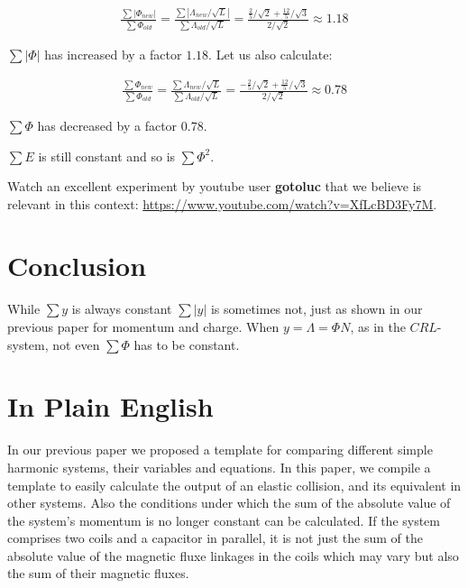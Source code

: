 \documentclass[]{elementary-physics}
\begin{document}
\begin{subequations}
\begin{align}
\frac{\sum |\Phi_{new}|}{\sum \Phi_{old}} = \frac{\sum |\Lambda_{new} / \sqrt{L}|}{\sum \Lambda_{old} / \sqrt{L}} = \frac{\frac{2}{5}/\sqrt{2}+\frac{12}{5}/\sqrt{3}}{2/\sqrt{2}}\approx 1.18
\end{align}
\end{subequations}

$\sum |\Phi|$ has increased by a factor $1.18$.
Let us also calculate:

\begin{subequations}
\begin{align}
\frac{\sum \Phi_{new}}{\sum \Phi_{old}} = \frac{\sum \Lambda_{new} / \sqrt{L}}{\sum \Lambda_{old} / \sqrt{L}} = \frac{-\frac{2}{5}/\sqrt{2}+\frac{12}{5}/\sqrt{3}}{2/\sqrt{2}}\approx 0.78
\end{align}
\end{subequations}

$\sum \Phi$ has decreased by a factor $0.78$.

$\sum E$ is still constant and so is $\sum {\Phi}^2$.

Watch an excellent experiment by youtube user \textbf{gotoluc} that we believe is relevant in this context: \url{https://www.youtube.com/watch?v=XfLcBD3Fy7M}.

\section{Conclusion}

While $\sum y$ is always constant $\sum |y|$ is sometimes not, just as shown in our previous paper\cite{ef2ch} for momentum and charge.
When $y = \Lambda = \Phi N$, as in the $CRL$-system, not even $\sum \Phi$ has to be constant.

\appendix

\section{In Plain English}

In our previous paper\cite{ef2ch} we proposed a template for comparing different simple harmonic systems, their variables and equations.
In this paper, we compile a template to easily calculate the output of an elastic collision, and its equivalent in other systems.
Also the conditions under which the sum of the absolute value of the system's momentum is no longer constant can be calculated.
If the system comprises two coils and a capacitor in parallel, it is not just the sum of the absolute value of the magnetic fluxe linkages in the coils which may vary but also the sum of their magnetic fluxes.
\end{document}
